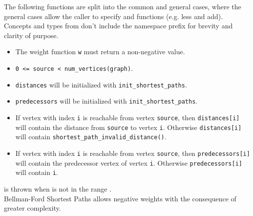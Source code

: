 The following functions are split into the common and general cases, where the general cases allow the caller
to specify  and  functions (e.g. less and add). Concepts and types from 
 don't include the namespace prefix for brevity and clarity of purpose.

{\small
      
      
}

\begin{itemdescr}
      \pnum\mandates
            \begin{itemize}
                  \item
                        The weight function \lstinline{w} must return a non-negative value.
            \end{itemize}
      \pnum\preconditions
            \begin{itemize}
                  \item
                        \lstinline{0 <= source < num_vertices(graph)}. 
                  \item
                        \lstinline{distances} will be initialized with \lstinline{init_shortest_paths}.
                  \item
                        \lstinline{predecessors} will be initialized with \lstinline{init_shortest_paths}.
            \end{itemize}
      \pnum\effects
            \begin{itemize}
                  \item
                        If vertex with index \lstinline{i} is reachable from vertex \lstinline{source}, then
                        \lstinline{distances[i]} will contain the distance from \lstinline{source} to vertex
                        \lstinline{i}.  Otherwise \lstinline{distances[i]} will contain
                        \lstinline{shortest_path_invalid_distance()}.
                  \item
                        If vertex with index \lstinline{i} is reachable
                        from vertex \lstinline{source}, then \lstinline{predecessors[i]} will contain the
                        predecessor vertex of vertex \lstinline{i}. Otherwise \lstinline{predecessors[i]} will contain
                        \lstinline{i}.
            \end{itemize}
      \pnum\throws {} is thrown when  is not in the range .  \\
      \pnum\remarks 
                        Bellman-Ford Shortest Paths allows negative weights with the consequence of greater complexity. \\
\end{itemdescr}



